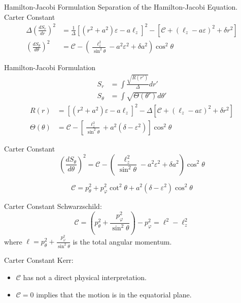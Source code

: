 \documentclass{beamer}
\begin{document}
\begin{darkframes}
\begin{frame}{Hamilton-Jacobi Formulation}
	Separation of the Hamilton-Jacobi Equation. Carter Constant
	\begin{align*}
	\Delta \left( \frac{dS_r}{dr}\right)^2 &= \frac{1}{\Delta} \left[ (r^2 +a^2) \varepsilon - a \ell_z \right]^2 - \left[ \mathcal{C} + (\ell_z - a \varepsilon)^2 + \delta r^2 \right]\\ 
	\left( \frac{dS_\theta}{d\theta}\right)^2 &= \mathcal{C} - \left( \frac{\ell_z^2}{\sin^2 \theta} - a^2 \varepsilon^2 + \delta a^2 \right) \cos^2 \theta	
	\end{align*}      
\end{frame}

\begin{frame}{Hamilton-Jacobi Formulation}
	\begin{align*}
	S_r &= \int \frac{\sqrt{R(r')}}{\Delta}dr'\\
	S_\theta &= \int \sqrt{\Theta(\theta')}d\theta'
	\end{align*}
	\pause 
	\begin{align*}
	R(r) &= \left[ (r^2 +a^2) \varepsilon - a \ell_z \right]^2 - \Delta \left[\mathcal{C} + (\ell_z - a \varepsilon)^2 + \delta r^2 \right]\\
	\Theta(\theta) &= \mathcal{C} - \left[ \frac{\ell_z^2}{\sin^2 \theta} + a^2 \left(\delta - \varepsilon^2 \right) \right] \cos^2 \theta
	\end{align*}      
\end{frame}

\begin{frame}{Carter Constant}
	\[\left( \frac{dS_\theta}{d\theta}\right)^2 = \mathcal{C} - \left( \frac{\ell_z^2}{\sin^2 \theta} - a^2 \varepsilon^2 + \delta a^2 \right) \cos^2 \theta\] 
	\bigskip
	\pause
	
	\[ \mathcal{C} = p_\theta^2 + p_\varphi^2 \cot^2 \theta + a^2 (\delta - \varepsilon^2) \cos^2 \theta \]     
\end{frame}

\begin{frame}{Carter Constant}
	Schwarzschild:		
	\[ \mathcal{C} = \left( p_\theta^2 + \frac{p_\varphi^2}{\sin^2 \theta} \right) - p_\varphi^2 = \ell^2 - \ell_z^2 \]   
	where $\ell = p_\theta^2 + \frac{p_\varphi^2}{\sin^2 \theta}$ is the total angular momentum.
\end{frame}

\begin{frame}{Carter Constant}
	Kerr:
	\pause		
	\begin{itemize}
	\item $\mathcal{C}$ has not a direct physical interpretation.
	\item $\mathcal{C}=0$ implies that the motion is in the equatorial plane.
	\end{itemize}
\end{frame}




\end{darkframes}
\end{document}
